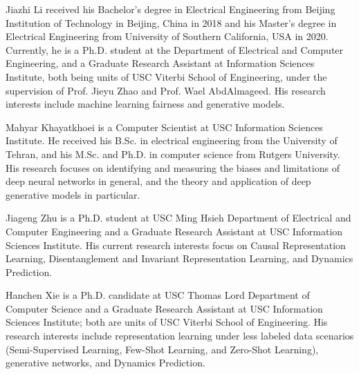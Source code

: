 \vspace{-12mm}

\begin{IEEEbiography}{Jiazhi Li}
received his Bachelor's degree in Electrical Engineering from Beijing Institution of Technology in Beijing, China in 2018 and his Master's degree in Electrical Engineering from University of Southern California, USA in 2020. Currently, he is a Ph.D. student at the Department of Electrical and Computer Engineering, and a Graduate Research Assistant at Information Sciences Institute, both being units of USC Viterbi School of Engineering, under the supervision of Prof. Jieyu Zhao and Prof. Wael AbdAlmageed. His research interests include machine learning fairness and generative models.
\end{IEEEbiography}

\vspace{-12mm}

\begin{IEEEbiography}{Mahyar Khayatkhoei}
is a Computer Scientist at USC Information Sciences Institute. He received his B.Sc. in electrical engineering from the University of Tehran, and his M.Sc. and Ph.D. in computer science from Rutgers University. His research focuses on identifying and measuring the biases and limitations of deep neural networks in general, and the theory and application of deep generative models in particular.
\end{IEEEbiography}

\vspace{-14mm}

\begin{IEEEbiography}{Jiageng Zhu}
is a Ph.D. student at USC Ming Hsieh Department of Electrical and Computer Engineering and a Graduate Research Assistant at USC Information Sciences Institute. His current research interests focus on Causal Representation Learning, Disentanglement and Invariant Representation Learning, and Dynamics Prediction.
\end{IEEEbiography}

\vspace{-18mm}

\begin{IEEEbiography}{Hanchen Xie}
is a Ph.D. candidate at USC Thomas Lord Department of Computer Science and a Graduate Research Assistant at USC Information Sciences Institute; both are units of USC Viterbi School of Engineering. His research interests include representation learning under less labeled data scenarios (\eg Semi-Supervised Learning, Few-Shot Learning, and Zero-Shot Learning), generative networks, and Dynamics Prediction.
\end{IEEEbiography}


